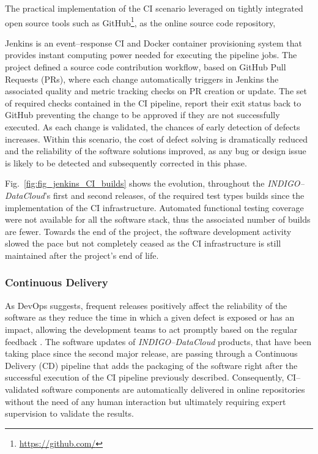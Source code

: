 \documentclass[journal]{IEEEtran}
\begin{document}
The practical implementation of the CI scenario leveraged on tightly integrated open
source tools such as GitHub\footnote{\url{https://github.com/}}, as the online source code repository,

Jenkins is an event--response CI and Docker container
provisioning system that provides instant computing power needed for executing the pipeline jobs.
The project defined a source code contribution workflow, based on GitHub Pull Requests
(PRs), where each change automatically triggers in Jenkins the associated quality and
metric tracking checks on PR creation or update. The set of required checks contained
in the CI pipeline, report their exit status back to GitHub preventing the change to be
approved if they are not successfully executed. As each change is validated, the chances
of early detection of defects increases. Within this scenario, the cost of defect solving
is dramatically reduced and the reliability of the software solutions improved, as any
bug or design issue is likely to be detected and subsequently corrected in this phase.

Fig.~\ref{fig:fig_jenkins_CI_builds} shows the evolution, throughout the
{\sl INDIGO--DataCloud}'s first and second releases, of the required test types builds since the
implementation of the CI infrastructure. Automated functional testing coverage were not
available for all the software stack, thus the associated number of builds are fewer. Towards the
end of the project, the software development activity slowed the pace but not completely ceased
as the CI infrastructure is still maintained after the project's end of life.

\subsubsection{Continuous Delivery}
As DevOps suggests, frequent releases positively affect the reliability of the software as
they reduce the time in which a given defect is exposed or has an impact, allowing the 
development teams to act promptly based on the regular feedback \cite{chen2015}. The software updates of
{\sl INDIGO--DataCloud} products, that have been taking place since the second major release, are passing through
a Continuous Delivery (CD) pipeline that adds the packaging of the software right after the
successful execution of the CI pipeline previously described. Consequently, CI--validated
software components are automatically delivered in online repositories without the need of
any human interaction but ultimately requiring expert supervision to validate the results.
\end{document}

